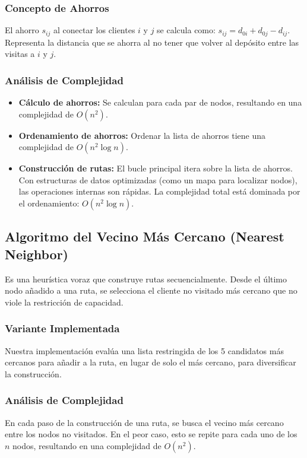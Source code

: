 \documentclass[a4paper,12pt]{article}
\begin{document}
\subsubsection{Concepto de Ahorros}
El ahorro $s_{ij}$ al conectar los clientes $i$ y $j$ se calcula como: $s_{ij} = d_{0i} + d_{0j} - d_{ij}$. Representa la distancia que se ahorra al no tener que volver al depósito entre las visitas a $i$ y $j$.

\subsubsection{Análisis de Complejidad}
\begin{itemize}
    \item \textbf{Cálculo de ahorros:} Se calculan para cada par de nodos, resultando en una complejidad de $O(n^2)$.
    \item \textbf{Ordenamiento de ahorros:} Ordenar la lista de ahorros tiene una complejidad de $O(n^2 \log n)$.
    \item \textbf{Construcción de rutas:} El bucle principal itera sobre la lista de ahorros. Con estructuras de datos optimizadas (como un mapa para localizar nodos), las operaciones internas son rápidas. La complejidad total está dominada por el ordenamiento: $O(n^2 \log n)$.
\end{itemize}

\subsection{Algoritmo del Vecino Más Cercano (Nearest Neighbor)}
Es una heurística voraz que construye rutas secuencialmente. Desde el último nodo añadido a una ruta, se selecciona el cliente no visitado más cercano que no viole la restricción de capacidad.

\subsubsection{Variante Implementada}
Nuestra implementación evalúa una lista restringida de los 5 candidatos más cercanos para añadir a la ruta, en lugar de solo el más cercano, para diversificar la construcción.

\subsubsection{Análisis de Complejidad}
En cada paso de la construcción de una ruta, se busca el vecino más cercano entre los nodos no visitados. En el peor caso, esto se repite para cada uno de los $n$ nodos, resultando en una complejidad de $O(n^2)$.
\end{document}
